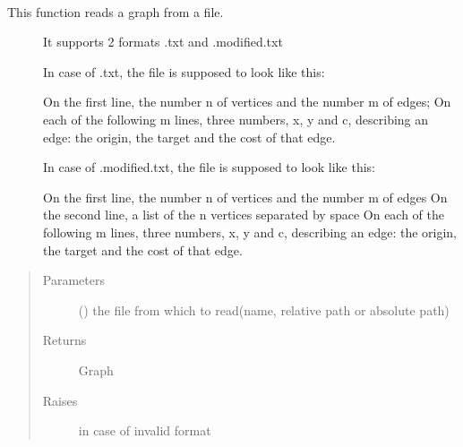 \documentclass[letterpaper,10pt,english]{sphinxmanual}
\begin{document}
\begin{fulllineitems}
\label{\detokenize{Graph:Graph.read_graph}}~\begin{description}
\item[{This function reads a graph from a file.}] \leavevmode
It supports 2 formats
.txt and  .modified.txt

In case of .txt, the file is supposed to look like this:

On the first line, the number n of vertices and the number m of edges;
On each of the following m lines, three numbers, x, y and c, describing an edge: the origin, the target and the cost of that edge.

In case of .modified.txt, the file is supposed to look like this:

On the first line, the number n of vertices and the number m of edges
On the second line, a list of the n vertices separated by space
On each of the following m lines, three numbers, x, y and c, describing an edge: the origin, the target and the cost of that edge.

\end{description}
\begin{quote}\begin{description}
\item[{Parameters}] \leavevmode
{} () \textendash{} the file from which to read(name, relative path or absolute path)

\item[{Returns}] \leavevmode
Graph

\item[{Raises}] \leavevmode
{} \textendash{} in case of invalid format

\end{description}\end{quote}

\end{fulllineitems}

\end{document}
